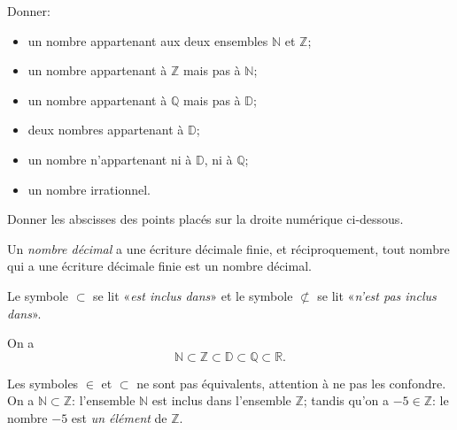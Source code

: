 \documentclass[11pt]{article}
\begin{document}
\begin{exemple}
  Donner:
  \begin{itemize}
    \item un nombre appartenant aux deux ensembles $\mathbb{N}$ et $\mathbb{Z}$;
    \item un nombre appartenant à $\mathbb{Z}$ mais pas à $\mathbb{N}$;
    \item un nombre appartenant à $\mathbb{Q}$ mais pas à $\mathbb{D}$;
    \item deux nombres appartenant à $\mathbb{D}$;
    \item un nombre n'appartenant ni à $\mathbb{D}$, ni à $\mathbb{Q}$;
    \item un nombre irrationnel.
  \end{itemize}
\end{exemple}
\begin{exemple}
  Donner les abscisses des points placés sur la droite numérique ci-dessous.
  \begin{center}
  \end{center}

\end{exemple}
\begin{rmq}
  Un \emph{nombre décimal} a une écriture décimale finie, et réciproquement,
  tout nombre qui a une écriture décimale finie est un nombre décimal.
\end{rmq}
\begin{notation}
  Le symbole $\subset$ se lit «\emph{est inclus dans}» et le symbole
  $\not\subset$ se lit «\emph{n'est pas inclus dans}».
\end{notation}
\begin{propadm}
  On a 
  \[
    \mathbb{N}\subset\mathbb{Z}\subset\mathbb{D}\subset\mathbb{Q}\subset\mathbb{R}.
  \]
\end{propadm}
\begin{rmq}
  Les symboles $\in$ et $\subset$ ne sont pas équivalents, attention à ne pas
  les confondre. On a $\mathbb{N}\subset \mathbb{Z}$: l'ensemble $\mathbb{N}$
  est inclus dans l'ensemble $\mathbb{Z}$; tandis qu'on a $-5\in\mathbb{Z}$: le
  nombre $-5$ est \emph{un élément} de $\mathbb{Z}$.
\end{rmq}
\end{document}
